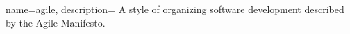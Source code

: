 {
    name=agile,
    description={
        A style of organizing software development described by the Agile Manifesto.
    }
}
